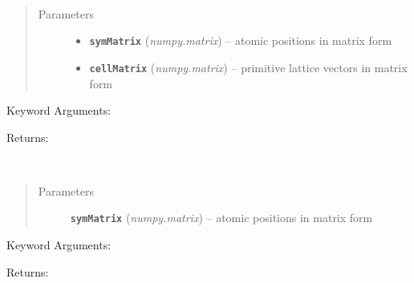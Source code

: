 \documentclass[letterpaper,10pt,english]{sphinxmanual}
\begin{document}

\begin{fulllineitems}
\label{retr:retr.rotateGamma}~\begin{quote}\begin{description}
\item[{Parameters}] \leavevmode\begin{itemize}
\item {} 
\textbf{\texttt{symMatrix}} (\emph{numpy.matrix}) -- atomic positions in matrix form

\item {} 
\textbf{\texttt{cellMatrix}} (\emph{numpy.matrix}) -- primitive lattice vectors in matrix form

\end{itemize}

\end{description}\end{quote}

Keyword Arguments:

Returns:

\end{fulllineitems}


\begin{fulllineitems}
\label{retr:retr.shiftCell}~\begin{quote}\begin{description}
\item[{Parameters}] \leavevmode
\textbf{\texttt{symMatrix}} (\emph{numpy.matrix}) -- atomic positions in matrix form

\end{description}\end{quote}

Keyword Arguments:

Returns:

\end{fulllineitems}

\end{document}
